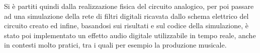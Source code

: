 \documentclass[12pt,a4paper,twoside,english,italian]{book}
\begin{document}
		Si è partiti quindi dalla realizzazione fisica del circuito analogico, per poi passare ad una simulazione della rete di filtri digitali ricavata dallo schema elettrico del circuito creato ed infine, basandosi sui risultati e sul codice della simulazione, è stato poi implementato un effetto audio digitale utilizzabile in tempo reale, anche in contesti molto pratici, tra i quali per esempio la produzione musicale.
	
	\mainmatter

	\raggedbottom
	
	
	
	
	
	
	
	
	
	
	
	

	
	
	\appendix
	
	
	
	
	
	\backmatter
	
	\printbibliography
\end{document}
